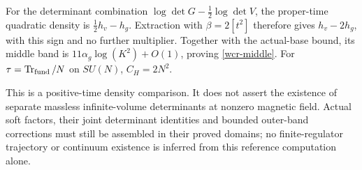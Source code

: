 For the determinant combination
\(\log\det G-\tfrac12\log\det V\), the proper-time quadratic density
is \(\tfrac12h_v-h_g\). Extraction with \(\beta=2[t^2]\) therefore
gives \(h_v-2h_g\), with this sign and no further multiplier.
Together with the actual-base bound, its middle band is
\(11\alpha_g\log(K^2)+O(1)\), proving \eqref{wcr-middle}.
For \(\tau=\operatorname{Tr}_{\rm fund}/N\) on \(SU(N)\),
\(C_H=2N^2\).

This is a positive-time density comparison. It does not assert the
existence of separate massless infinite-volume determinants at nonzero
magnetic field. Actual soft factors, their joint determinant identities
and bounded outer-band corrections must still be assembled in their
proved domains; no finite-regulator trajectory or continuum existence
is inferred from this reference computation alone.

